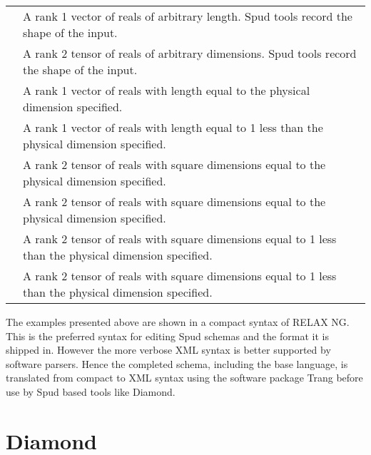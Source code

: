 \documentclass[a4paper, 11pt]{book}
\begin{document}
\begin{tabular}{lp{8cm}}
\lstinline *real_vector* & A rank 1 vector of reals of arbitrary length.  Spud tools record the shape of the input. \\
\lstinline *real_tensor* & A rank 2 tensor of reals of arbitrary dimensions.  Spud tools record the shape of the input. \\
\lstinline *real_dim_vector* & A rank 1 vector of reals with length equal to the physical dimension specified. \\
\lstinline *real_dim_minus_one_vector* & A rank 1 vector of reals with length equal to 1 less than the physical dimension specified. \\
\lstinline *real_dim_tensor* & A rank 2 tensor of reals with square dimensions equal to the physical dimension specified. \\
\lstinline *real_dim_symmetric_tensor* & A rank 2 tensor of reals with square dimensions equal to the physical dimension specified. \\
\lstinline *real_dim_minus_one_tensor* & A rank 2 tensor of reals with square dimensions equal to 1 less than the physical dimension specified. \\
\lstinline *real_dim_minus_one_symmetric_tensor* & A rank 2 tensor of reals with square dimensions equal to 1 less than the physical dimension specified.
\end{tabular}

The examples presented above are shown in a compact syntax of RELAX NG.  This is the preferred syntax for editing Spud schemas and the format it is shipped in.   However the more verbose XML syntax is better supported by software parsers.  Hence the completed schema, including the base language, is translated from compact to XML syntax using the software package Trang before use by Spud based tools like Diamond.

\chapter{Diamond}
\end{document}
